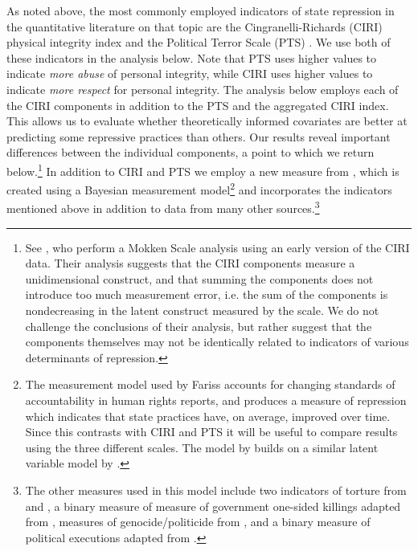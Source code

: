 \documentclass[11pt]{article}
\begin{document}
As noted above, the most commonly employed indicators of state repression in the quantitative literature on that topic are the Cingranelli-Richards (CIRI) physical integrity index \citep{CIRI2010} and the Political Terror Scale (PTS) \citep{GibneyCornettWood2009}. We use both of these indicators in the analysis below. Note that PTS uses higher values to indicate {\em more abuse} of personal integrity, while CIRI uses higher values to indicate {\em more respect} for personal integrity. The analysis below employs each of the CIRI components in addition to the PTS and the aggregated CIRI index. This allows us to evaluate whether theoretically informed covariates are better at predicting some repressive practices than others. Our results reveal important differences between the individual components, a point to which we return below.\footnote{See \citet{CingranelliRichards1999isq}, who perform a Mokken Scale analysis using an early version of the CIRI data. Their analysis suggests that the CIRI components measure a unidimensional construct, and that summing the components does not introduce too much measurement error, i.e. the sum of the components is nondecreasing in the latent construct measured by the scale. We do not challenge the conclusions of their analysis, but rather suggest that the components themselves may not be identically related to indicators of various determinants of repression.} In addition to CIRI and PTS we employ a new measure from \citet{Fariss2013}, which is created using a Bayesian measurement model\footnote{The measurement model used by Fariss accounts for changing standards of accountability in human rights reports, and produces a measure of repression which indicates that state practices have, on average, improved over time. Since this contrasts with CIRI and PTS it will be useful to compare results using the three different scales. The model by \citeauthor{Fariss2013} builds on a similar latent variable model by \citet{FarissSchnakenberg2011}.} and incorporates the indicators mentioned above in addition to data from many other sources.\footnote{The other measures used in this model include two indicators of torture from \citet{Hathaway2002} and \citet{ConradHaglundMoore2012}, a binary measure of measure of government one-sided killings adapted from \citet{EckHultman2007}, measures of genocide/politicide from \citet{HarffGurr1988,Rummel1995,MarshallHarffGurr2009}, and a binary measure of political executions adapted from \citet{TaylorJodice1983}.}
\end{document}
